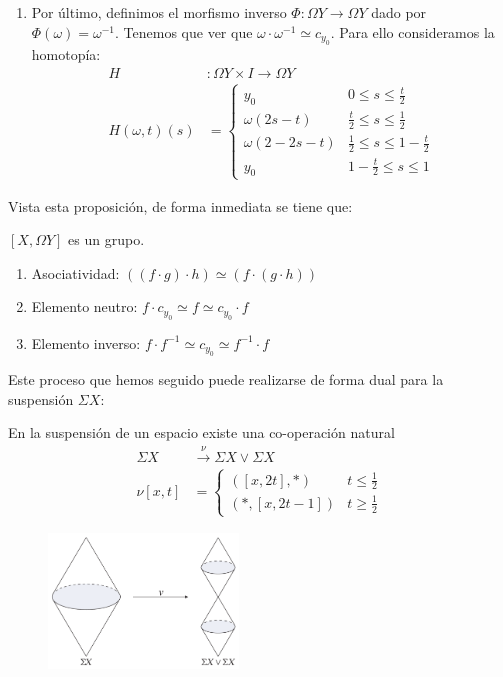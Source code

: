 \begin{demo}
\begin{enumerate}
\item Por último, definimos el morfismo inverso $\varPhi : \Omega Y \longrightarrow \Omega Y $ dado por $\varPhi(\omega) = \omega^{-1}$. Tenemos que ver que $\omega \cdotp \omega^{-1} \simeq c_{y_0}$. Para ello consideramos la homotopía:
\begin{align*}
H &: \Omega Y \times I \longrightarrow \Omega Y \\
H(\omega, t)(s) &= 
\begin{cases}
y_0 & 0 \leq s \leq \frac{t}{2} \\
\omega(2s - t) & \frac{t}{2} \leq s \leq \frac{1}{2} \\
\omega(2 - 2s - t) & \frac{1}{2} \leq s \leq 1 - \frac{t}{2} \\
y_0 & 1 - \frac{t}{2} \leq s \leq 1
\end{cases}
\end{align*}
\end{enumerate}
\end{demo}
Vista esta proposición, de forma inmediata se tiene que:
\begin{teor}
$[X, \Omega Y]$ es un grupo.
\end{teor}
\begin{demo}
\begin{enumerate}
\item Asociatividad: $ \left((f \cdotp g) \cdotp h \right) \simeq \left(f \cdotp (g \cdotp h) \right)  $
\item Elemento neutro: $f \cdotp c_{y_0} \simeq f \simeq c_{y_0} \cdotp f$
\item Elemento inverso: $ f \cdotp f^{-1} \simeq c_{y_0} \simeq f^{-1} \cdotp f$
\end{enumerate}
\end{demo}
Este proceso que hemos seguido puede realizarse de forma dual para la suspensión $\Sigma X$:\par
En la suspensión de un espacio existe una co-operación natural
\begin{align*}
\Sigma X &\stackrel{\nu}{\longrightarrow} \Sigma X \vee \Sigma X \\
\nu [x, t] &= 
\begin{cases}
([x, 2t], \ast ) & t \leq \frac{1}{2} \\
( \ast, [x, 2t -1]) & t \geq \frac{1}{2}
\end{cases}
\end{align*}
\begin{figure}[h]
\centering
\includegraphics[width=0.45\textwidth]{images/suspoperac.pdf}
\end{figure}

